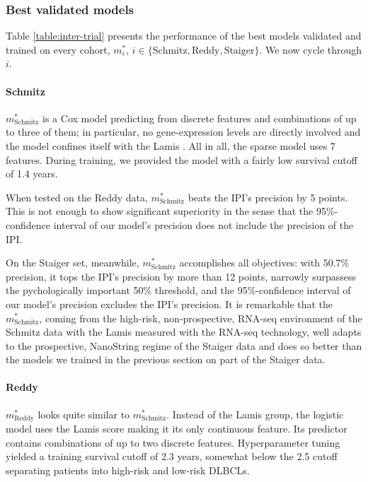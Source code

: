 \subsubsection{Best validated models}

Table \ref{table:inter-trial} presents the performance of the best models validated and trained on 
every cohort, $m_i^*$, $i \in \{ \text{Schmitz}, \text{Reddy}, \text{Staiger} \}$. We now cycle 
through $i$.



\paragraph{Schmitz}
$m^*_\text{Schmitz}$ is a Cox model predicting from discrete features and combinations of up to 
three of them; in particular, no gene-expression levels are directly involved and the model confines 
itself with the Lamis . All in all, the sparse model uses \num{7} features. During 
training, we provided the model with a fairly low survival cutoff of \num{1.4} years.

When tested on the Reddy data, $m^*_\text{Schmitz}$ beats the IPI's precision by 5 points. This 
is not enough to show significant superiority in the sense that the \num{95}\%-confidence interval 
of our model's precision does not include the precision of the IPI.

On the Staiger set, meanwhile, $m^*_\text{Schmitz}$ accomplishes all objectives: with 
\num{50.7}\% precision, it tops the IPI's precision by more than 12 points, narrowly surpassess the 
pychologically important \num{50}\% threshold, and the \num{95}\%-confidence interval of our model's 
precision excludes the IPI's precision. It is remarkable that the $m^*_\text{Schmitz}$, coming from 
the high-risk, non-prospective, RNA-seq environment of the Schmitz data with the Lamis measured with the 
RNA-seq technology, well adapts to the prospective, NanoString regime of the Staiger data and 
does so better than the models we trained in the previous section on part of the Staiger data.

\paragraph{Reddy}
$m^*_\text{Reddy}$ looks quite similar to $m^*_\text{Schmitz}$. Instead of the Lamis group, the 
logistic model uses the Lamis score making it its only continuous feature. Its predictor contains 
combinations of up to two discrete features. Hyperparameter tuning yielded a training survival 
cutoff of \num{2.3} years, somewhat below the \num{2.5} cutoff separating patients into high-risk 
and low-risk DLBCLs. 

